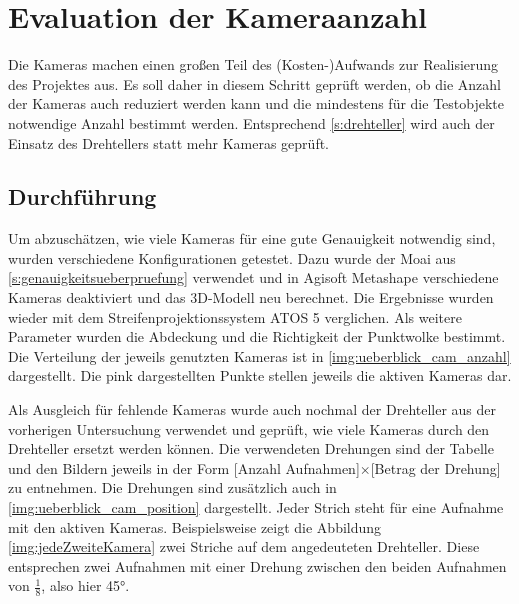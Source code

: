 \documentclass[./00PhotoBox.tex]{subfiles}
\begin{document}
\section{Evaluation der Kameraanzahl}
\label{s:kameraanzahl}
Die Kameras machen einen großen Teil des (Kosten-)Aufwands zur Realisierung des Projektes aus. Es soll daher in diesem Schritt geprüft werden, ob die Anzahl der Kameras auch reduziert werden kann und die mindestens für die Testobjekte notwendige Anzahl bestimmt werden. Entsprechend \autoref{s:drehteller} wird auch der Einsatz des Drehtellers statt mehr Kameras geprüft.

\subsection{Durchführung}
Um abzuschätzen, wie viele Kameras für eine gute Genauigkeit notwendig sind, wurden verschiedene Konfigurationen getestet. Dazu wurde der Moai aus \autoref{s:genauigkeitsueberpruefung} verwendet und in Agisoft Metashape verschiedene Kameras deaktiviert und das 3D-Modell neu berechnet. Die Ergebnisse wurden wieder mit dem Streifenprojektionssystem ATOS 5 verglichen. Als weitere Parameter wurden die Abdeckung und die Richtigkeit der Punktwolke bestimmt. Die Verteilung der jeweils genutzten Kameras ist in \autoref{img:ueberblick_cam_anzahl} dargestellt. Die pink dargestellten Punkte stellen jeweils die aktiven Kameras dar.

Als Ausgleich für fehlende Kameras wurde auch nochmal der Drehteller aus der vorherigen Untersuchung verwendet und geprüft, wie viele Kameras durch den Drehteller ersetzt werden können. Die verwendeten Drehungen sind der Tabelle und den Bildern jeweils in der Form [Anzahl Aufnahmen]$\times$[Betrag der Drehung] zu entnehmen. Die Drehungen sind zusätzlich auch in \autoref{img:ueberblick_cam_position} dargestellt. Jeder Strich steht für eine Aufnahme mit den aktiven Kameras. Beispielsweise zeigt die Abbildung \autoref{img:jedeZweiteKamera} zwei Striche auf dem angedeuteten Drehteller. Diese entsprechen zwei Aufnahmen mit einer Drehung zwischen den beiden Aufnahmen von $\frac{1}{8}$, also hier \ang{45}.
\end{document}
